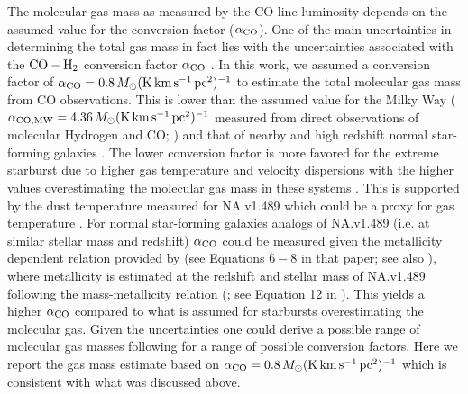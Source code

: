 \documentclass[iop,apj,useAMS,usenatbib]{emulateapj-rtx4}
\begin{document}
The molecular gas mass as measured by the CO line luminosity depends
on the assumed value for the conversion factor ($\alpha_{\rm
  CO}$). One of the main uncertainties in determining the total gas
mass in fact lies with the uncertainties associated with the ${\rm
  CO-H_2}$ conversion factor $\alpha_{\rm CO}$ \citep {Narayanan2012,
  Spilker2015}. In this work, we assumed a conversion factor of
$\alpha_{\rm CO} = 0.8\,M_{\odot}{\rm (K\,km\,s^{-1}\,pc^2)^{-1}}$ to
estimate the total molecular gas mass from CO observations. This is
lower than the assumed value for the Milky Way ($\alpha_{\rm CO,MW} = 4.36\,M_{\odot}{\rm
  (K\,km\,s^{-1}\,pc^2)^{-1}}$ measured from direct observations of
molecular Hydrogen and CO; \citealp{Strong1996, Leroy2011, Bolatto2013}) and that of nearby and
high redshift normal star-forming galaxies \citep{Sandstrom2013,
  Tacconi2013}. The lower conversion factor is more favored for
the extreme starburst due to higher gas temperature and velocity
dispersions \citep{Narayanan2011, Narayanan2012, Papadopoulos2012, Bolatto2013} with the
higher values overestimating the molecular gas mass in these systems
\citep{Downes1993, Solomon1997}. This is supported by the dust temperature measured
for NA.v1.489 which could be a proxy for gas temperature
\citep{Yao2003}. For normal star-forming galaxies
analogs of NA.v1.489 (i.e. at similar stellar mass and
redshift) $\alpha_{\rm CO}$ could be measured given the metallicity dependent relation provided by
\citet{Genzel2015} (see Equations $6-8$ in that paper; see also
\citealp{Dessauges2016}), where metallicity is estimated at the redshift and
stellar mass of NA.v1.489 following the mass-metallicity relation
(\citealp{Erb2006, Maiolino2008, Wuyts2014, Zahid2014}; see
Equation 12 in \citet{Genzel2015}). This yields a higher $\alpha_{\rm
  CO}$ compared to what is assumed for starbursts overestimating the
molecular gas. Given the uncertainties one could
derive a possible range of molecular gas masses following
\citet{Ivison2011} for a range of possible
conversion factors. Here we report the gas mass estimate based on
$\alpha_{\rm CO} = 0.8\,M_{\odot}{\rm (K\,km\,s^{-1}\,pc^2)^{-1}}$
which is consistent with what was discussed above.
\end{document}
